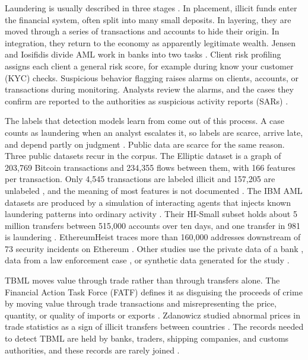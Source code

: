 \documentclass[journal]{IEEEtran}
\begin{document}
Laundering is usually described in three stages \cite{raj2024ai,irshad2024gcfmld}. In placement, illicit funds enter the financial system, often split into many small deposits. In layering, they are moved through a series of transactions and accounts to hide their origin. In integration, they return to the economy as apparently legitimate wealth. Jensen and Iosifidis divide AML work in banks into two tasks \cite{jensen2023fighting}. Client risk profiling assigns each client a general risk score, for example during know your customer (KYC) checks. Suspicious behavior flagging raises alarms on clients, accounts, or transactions during monitoring. Analysts review the alarms, and the cases they confirm are reported to the authorities as suspicious activity reports (SARs) \cite{irshad2024gcfmld}.

The labels that detection models learn from come out of this process. A case counts as laundering when an analyst escalates it, so labels are scarce, arrive late, and depend partly on judgment \cite{jensen2023fighting,irshad2024gcfmld}. Public data are scarce for the same reason. Three public datasets recur in the corpus. The Elliptic dataset is a graph of 203{,}769 Bitcoin transactions and 234{,}355 flows between them, with 166 features per transaction. Only 4{,}545 transactions are labeled illicit and 157{,}205 are unlabeled \cite{weber2019elliptic,yu2023aetransgat}, and the meaning of most features is not documented \cite{ferretti2025gnn}. The IBM AML datasets are produced by a simulation of interacting agents that injects known laundering patterns into ordinary activity \cite{altman2023ibmaml}. Their HI-Small subset holds about 5 million transfers between 515{,}000 accounts over ten days, and one transfer in 981 is laundering \cite{mao2026pmegnn}. EthereumHeist traces more than 160{,}000 addresses downstream of 73 security incidents on Ethereum \cite{wu2024heists}. Other studies use the private data of a bank \cite{irshad2024gcfmld}, data from a law enforcement case \cite{luo2024mlad}, or synthetic data generated for the study \cite{amber2026cbdc}.

TBML moves value through trade rather than through transfers alone. The Financial Action Task Force (FATF) defines it as disguising the proceeds of crime by moving value through trade transactions and misrepresenting the price, quantity, or quality of imports or exports \cite{fatf2006tbml}. Zdanowicz studied abnormal prices in trade statistics as a sign of illicit transfers between countries \cite{zdanowicz2009}. The records needed to detect TBML are held by banks, traders, shipping companies, and customs authorities, and these records are rarely joined \cite{tiwari2025tbml,dudczyk2024supply}.
\end{document}
